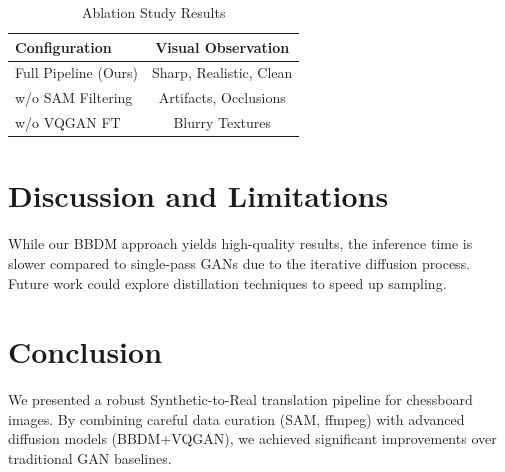 \documentclass[12pt,a4paper]{article}
\begin{document}
\begin{table}[ht]
\centering
\caption{Ablation Study Results}
\begin{tabular}{lc}
\toprule
\textbf{Configuration} & \textbf{Visual Observation} \\
\midrule
Full Pipeline (Ours) & Sharp, Realistic, Clean \\
w/o SAM Filtering & Artifacts, Occlusions \\
w/o VQGAN FT & Blurry Textures \\
\bottomrule
\end{tabular}
\end{table}

\section{Discussion and Limitations}
While our BBDM approach yields high-quality results, the inference time is slower compared to single-pass GANs due to the iterative diffusion process. Future work could explore distillation techniques to speed up sampling.

\section{Conclusion}
We presented a robust Synthetic-to-Real translation pipeline for chessboard images. By combining careful data curation (SAM, ffmpeg) with advanced diffusion models (BBDM+VQGAN), we achieved significant improvements over traditional GAN baselines.
\end{document}
